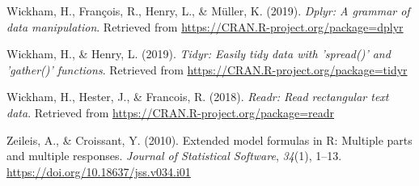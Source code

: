 \documentclass[man]{apa6}
\begin{document}
\leavevmode\hypertarget{ref-R-dplyr}{}%
Wickham, H., François, R., Henry, L., \& Müller, K. (2019). \emph{Dplyr: A grammar of data manipulation}. Retrieved from \url{https://CRAN.R-project.org/package=dplyr}

\leavevmode\hypertarget{ref-R-tidyr}{}%
Wickham, H., \& Henry, L. (2019). \emph{Tidyr: Easily tidy data with 'spread()' and 'gather()' functions}. Retrieved from \url{https://CRAN.R-project.org/package=tidyr}

\leavevmode\hypertarget{ref-R-readr}{}%
Wickham, H., Hester, J., \& Francois, R. (2018). \emph{Readr: Read rectangular text data}. Retrieved from \url{https://CRAN.R-project.org/package=readr}

\leavevmode\hypertarget{ref-R-Formula}{}%
Zeileis, A., \& Croissant, Y. (2010). Extended model formulas in R: Multiple parts and multiple responses. \emph{Journal of Statistical Software}, \emph{34}(1), 1--13. \url{https://doi.org/10.18637/jss.v034.i01}

\endgroup
\end{document}
